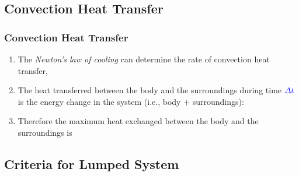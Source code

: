 \documentclass[10pt,compress]{beamer}
\newcommand{\blue}{\textcolor{blue}}
\begin{document}
\subsection{Convection Heat Transfer}

\begin{frame}
 \frametitle{Convection Heat Transfer}
   \begin{enumerate}%
     \item<1-> The {\it Newton's law of cooling} can determine the rate of convection heat transfer,
          \visible<1->{\blue{\begin{equation}
              \dot{Q}(t) = hA_{s}\left[T(t) - T_{\infty}\right] \hspace{1cm} \mathbf{(W)}
          \end{equation}}}
     \item<2-> The heat transferred between the body and the surroundings during time \blue{$\Delta t$} is the energy change in the system (i.e., body + surroundings):
     \item<3-> Therefore the maximum heat exchanged between the body and the surroundings is
   \end{enumerate}
\end{frame}

\subsection{Criteria for Lumped System}
\end{document}
